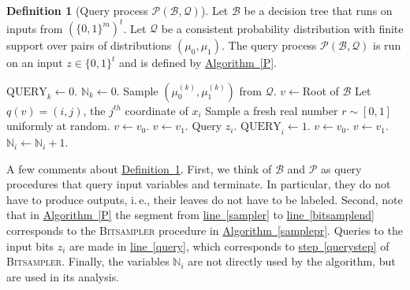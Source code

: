 \documentclass[11pt]{article}
\numberwithin{equation}{section}
\theoremstyle{definition}
\newtheorem{definition}[theorem]{Definition}
\theoremstyle{plain}
\newcommand{\N}{\mathbb N}
\newcommand{\ie}{i.\,e.}
\newcommand{\expref}[2]{\hyperref[#2]{#1~\ref{#2}}}
\newcommand{\q}{\text{QUERY}}
\newcommand{\clB}{\mathcal{B}}
\newcommand{\clQ}{\mathcal{Q}}
\newcommand{\clP}{\mathcal{P}}
\begin{document}
\begin{definition}[Query process $\clP(\clB, \clQ)$]
\label{def:P}
Let $\clB$ be a decision tree that runs on inputs from $\left(\{0,1\}^m\right)^t$.  Let $\clQ$ be a consistent probability distribution with finite support over pairs of distributions $(\mu_0, \mu_1)$.  
The query process $\clP(\clB, \clQ)$ is run on an input $z \in \{0,1\}^t$ and is defined by \expref{Algorithm}{P}.
\end{definition}
\begin{algorithm}[!h]
\DontPrintSemicolon
\caption{ $\clP (\clB, \clQ)$}
\label{P}
%
{$\q_k \gets 0$. 
$\N_k \gets 0$. 
Sample $(\mu_0^{(k)}, \mu_1^{(k)})$ from $\clQ$.  \label{Qrandom} \;}
$v \gets $Root of $\clB$ 
\While{$v$ is not a leaf of $\clB$}
{
Let $q(v)=(i,j)$, the $j^{th}$ coordinate of $x_i$ \label{P_queries_xi}\;
\If{$\q_i = 0$}
{Sample a fresh real number $r \sim [0,1]$ uniformly at random. \label{sampler}\;
{$v \gets v_0$. \;
}
{$v \gets v_1$. \;
 }
\Else
{Query $z_i$. $\q_i \gets 1$. \label{query}\;
{$v \gets v_0$. \;}
\Else
{$v \gets v_1$. \; \label{bitsamplend}}
}
$ \N_i\gets \N_i+1$. \;}
}
\end{algorithm}
A few comments about \expref{Definition}{def:P}.  First, we think of $\clB$ and $\clP$ as query procedures that query input variables and terminate. In particular, they do not have to produce outputs, \ie, their leaves do not have to be labeled.
Second, note that in \expref{Algorithm}{P} the segment from \expref{line}{sampler} to \expref{line}{bitsamplend} corresponds to the \textsc{Bitsampler} procedure in \expref{Algorithm}{samplepr}.  Queries to the input bits $z_i$ are made in 
\expref{line}{query}, which corresponds to \expref{step}{querystep} of \textsc{Bitsampler}. Finally, the variables $\N_i$ are not directly used by the algorithm, but are used in its analysis.
\end{document}

